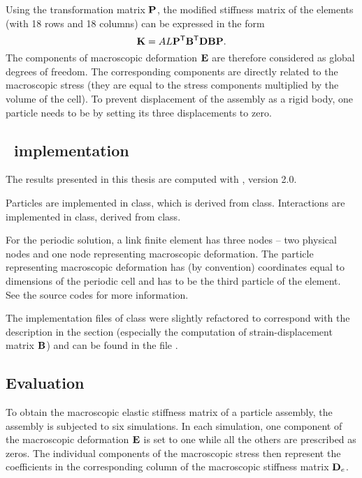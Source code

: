 Using the transformation matrix $\matTPeri$, the modified stiffness matrix of the  elements (with 18 rows and 18
columns) can be expressed in the form
\begin{equation}
	\linkStiffnessMatrix
	=
	\linkCrossSectionArea\linkLength
	\matTPeri\T
	\linkStrainDisplacementMatrix\T\materialStiffnessMatrix\linkStrainDisplacementMatrix
	\matTPeri
	.
\end{equation}
The components of macroscopic deformation $\macroscopicDeformationVector$ are therefore considered as global degrees of freedom.
The corresponding  components are directly related to the macroscopic stress
(they are equal to the stress components multiplied by the volume of the cell).
To prevent displacement of the assembly as a rigid
body, one particle needs to be  by setting its three displacements to zero.


\subsection{\OOFEM\ implementation}
The results presented in this thesis are computed with \OOFEM, version 2{.}0.

Particles are implemented in  class, which is derived from  class.
Interactions are implemented in  class, derived from  class.

For the periodic solution, a link finite element has three nodes -- two physical nodes and one node representing macroscopic deformation.
The particle representing macroscopic deformation has (by convention) coordinates equal to dimensions of the periodic cell and has to be the third particle of the element.
See the source codes for more information.

The implementation files of  class were slightly refactored to correspond with the description in the section (especially the computation of strain-displacement matrix $\linkStrainDisplacementMatrix$) and can be found in the file .


\subsection{Evaluation}
To obtain the macroscopic elastic stiffness matrix of a particle assembly, the assembly is subjected to six simulations.
In each simulation, one component of the macroscopic deformation $\macroscopicDeformationVector$
is set to one while all the others are prescribed as zeros.
The individual components of the macroscopic stress then represent the coefficients in the corresponding column of the macroscopic stiffness matrix $\stiffnessMatrixElastic$.


